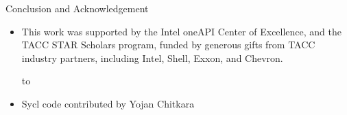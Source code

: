 \documentclass[10pt]{beamer}
\begin{document}
\begin{comment}
  \begin{frame}[containsverbatim]{Can we use execution policies?}
    \begin{itemize}
    \item Last time I tried there was a compiler issue
    \item That 5-point stencil is hard to express in range views!
    \end{itemize}
  \end{frame}
\end{comment}

\begin{frame}[containsverbatim]{Conclusion and Acknowledgement}
  \begin{itemize}
  \item This work was supported by
    the Intel oneAPI Center of Excellence, and the 
    TACC STAR Scholars program,
    funded by generous gifts from TACC industry partners, including Intel, Shell, Exxon,
    and Chevron.\par
  \hbox to 
  \item Sycl code contributed by Yojan Chitkara
  \end{itemize}
\end{frame}
\end{document}

